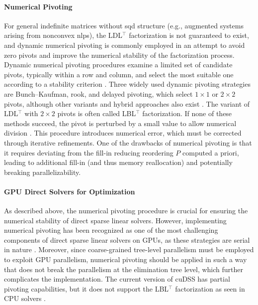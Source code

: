 \documentclass{article}
\begin{document}
\paragraph{Numerical Pivoting}

For general indefinite matrices without \gls*{sqd} structure (e.g., augmented systems \cite{wachterImplementationInteriorpointFilter2006} arising from nonconvex \glspl*{nlp}), the LDL$^\top$ factorization is not guaranteed to exist, and dynamic numerical pivoting is commonly employed in an attempt to avoid zero pivots and improve the numerical stability of the factorization process.
Dynamic numerical pivoting procedures examine a limited set of candidate pivots, typically within a row and column, and select the most suitable one according to a stability criterion \cite{schenkFASTFACTORIZATIONPIVOTING}.
Three widely used dynamic pivoting strategies are Bunch–Kaufman, rook, and delayed pivoting, which select $1 \times 1$ or $2 \times 2$ pivots, although other variants and hybrid approaches also exist \cite{duffDirectMethodsSparse2017}.
The variant of LDL$^\top$ with $2 \times 2$ pivots is often called LBL$^\top$ factorization.
If none of these methods succeed, the pivot is perturbed by a small value to allow numerical division \cite{schenkFASTFACTORIZATIONPIVOTING}.
This procedure introduces numerical error, which must be corrected through iterative refinements.
One of the drawbacks of numerical pivoting is that it requires deviating from the fill-in reducing reordering $P$ computed a priori, leading to additional fill-in (and thus memory reallocation) and potentially breaking parallelizability.


\paragraph{GPU Direct Solvers for Optimization}
As described above, the numerical pivoting procedure is crucial for ensuring the numerical stability of direct sparse linear solvers.
However, implementing numerical pivoting has been recognized as one of the most challenging components of direct sparse linear solvers on GPUs, as these strategies are serial in nature \cite{swirydowiczLinearSolversPower2022}.
Moreover, since coarse-grained tree-level parallelism must be employed to exploit GPU parallelism, numerical pivoting should be applied in such a way that does not break the parallelism at the elimination tree level, which further complicates the implementation.
The current version of cuDSS has partial pivoting capabilities, but it does not support the LBL$^\top$ factorization as seen in CPU solvers \cite{nvidiaNVIDIACuDSSPreview}.
\end{document}
